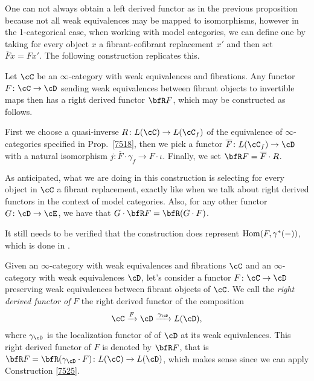 One can not always obtain a left derived functor as in the previous proposition
because not all weak equivalences may be mapped to isomorphisms,
however in the 1-categorical case, when working with model categories, we can
define one by taking for every object $x$ a fibrant-cofibrant replacement $x'$
and then set $\overline{F}x=Fx'$. The following construction replicates this.

\begin{construction}\label{7525}
  Let $\cC$ be an $\infty$-category with weak equivalences and fibrations. Any
  functor $F\colon\cC\rightarrow\cD$ sending weak equivalences between fibrant
  objects to invertible maps then has a right derived functor $\bfR F$, which
  may be constructed as follows.

  \noindent
  First we choose a quasi-inverse $R\colon L(\cC)\rightarrow L(\cC_f)$ of the
  equivalence of $\infty$-categories specified in Prop.\ \ref{7518}, then we
  pick a functor $\overline{F}\colon L(\cC_f)\rightarrow\cD$ with a natural
  isomorphism $j\colon\overline{F}\cdot\gamma_f\rightarrow F\cdot\iota$.
  Finally, we set $\bfR F=\overline{F}\cdot R$.

  \noindent
  As anticipated, what we are doing in this construction is selecting
  for every object in $\cC$ a fibrant replacement, exactly like when we talk
  about right derived functors in the context of model categories.
  Also, for any other functor $G\colon\cD\rightarrow\cE$, we have that
  $G\cdot\bfR F=\bfR(G\cdot F)$.

  \noindent
  It still needs to be verified that the construction does represent
  $\operatorname{Hom}(F,\gamma^*(-))$, which is done in \cite[Rem.\ 7.5.25]{Cis19}.
\end{construction}

\begin{defn}
  Given an $\infty$-category with weak equivalences and fibrations $\cC$ and an
  $\infty$-category with weak equivalences $\cD$, let's consider a functor
  $F\colon\cC\rightarrow\cD$ preserving weak equivalences between fibrant
  objects of $\cC$. We call the \emph{right derived functor of} $F$ the right
  derived functor of the composition
  \[\cC\xrightarrow{F}\cD\xrightarrow{\gamma_{\cD}}L(\cD),\]
  where $\gamma_\cD$ is the localization functor of of $\cD$ at its weak
  equivalences. This right derived functor of $F$ is denoted by $\bfR F$, that
  is $\bfR F=\bfR(\gamma_{\cD}\cdot F)\colon L(\cC)\rightarrow L(\cD)$, which
  makes sense since we can apply Construction \ref{7525}.
\end{defn}

